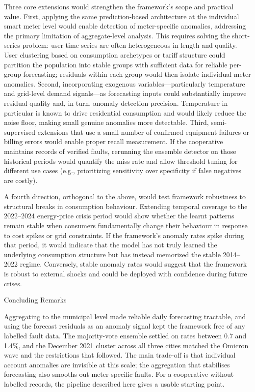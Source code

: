 ﻿\documentclass[12pt,reqno, twoside]{amsbook}
\makeatletter
\numberwithin{figure}{chapter}
\numberwithin{table}{chapter}
\numberwithin{equation}{chapter}
\def\section{\@startsection{section}{1}%
      \z@{.5\linespacing\@plus.7\linespacing}{.25\linespacing}%
      {\normalfont\bfseries\flushleft}}
\theoremstyle{plain}
\numberwithin{equation}{chapter}
\numberwithin{section}{chapter}
\makeatother
\begin{document}
Three core extensions would strengthen the framework's scope and practical value. First, applying the same prediction-based architecture at the individual smart meter level would enable detection of meter-specific anomalies, addressing the primary limitation of aggregate-level analysis. This requires solving the short-series problem: user time-series are often heterogeneous in length and quality. User clustering based on consumption archetypes or tariff structure could partition the population into stable groups with sufficient data for reliable per-group forecasting; residuals within each group would then isolate individual meter anomalies. Second, incorporating exogenous variables—particularly temperature and grid-level demand signals—as forecasting inputs could substantially improve residual quality and, in turn, anomaly detection precision. Temperature in particular is known to drive residential consumption and would likely reduce the noise floor, making small genuine anomalies more detectable. Third, semi-supervised extensions that use a small number of confirmed equipment failures or billing errors would enable proper recall measurement. If the cooperative maintains records of verified faults, rerunning the ensemble detector on those historical periods would quantify the miss rate and allow threshold tuning for different use cases (e.g., prioritizing sensitivity over specificity if false negatives are costly).

A fourth direction, orthogonal to the above, would test framework robustness to structural breaks in consumption behaviour. Extending temporal coverage to the 2022--2024 energy-price crisis period would show whether the learnt patterns remain stable when consumers fundamentally change their behaviour in response to cost spikes or grid constraints. If the framework's anomaly rates spike during that period, it would indicate that the model has not truly learned the underlying consumption structure but has instead memorized the stable 2014--2022 regime. Conversely, stable anomaly rates would suggest that the framework is robust to external shocks and could be deployed with confidence during future crises.

\section{Concluding Remarks}

Aggregating to the municipal level made reliable daily forecasting tractable, and using the forecast residuals as an anomaly signal kept the framework free of any labelled fault data. The majority-vote ensemble settled on rates between 0.7 and 1.4\%, and the December 2021 cluster across all three cities matched the Omicron wave and the restrictions that followed. The main trade-off is that individual account anomalies are invisible at this scale; the aggregation that stabilises forecasting also smooths out meter-specific faults. For a cooperative without labelled records, the pipeline described here gives a usable starting point.

\printbibliography[title=References]
\end{document}
